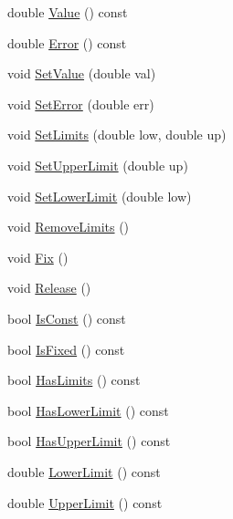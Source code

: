 \begin{DoxyCompactItemize}
\item 
double \mbox{\hyperlink{classROOT_1_1Minuit2_1_1MinuitParameter_ac77aed82006ba9e9598df49a1753d31c}{Value}} () const
\item 
double \mbox{\hyperlink{classROOT_1_1Minuit2_1_1MinuitParameter_af92997a2e9a7209fbddd286bbd1dbc3d}{Error}} () const
\item 
void \mbox{\hyperlink{classROOT_1_1Minuit2_1_1MinuitParameter_a535d59656c70ba8a0cc0ff196bac2d93}{Set\+Value}} (double val)
\item 
void \mbox{\hyperlink{classROOT_1_1Minuit2_1_1MinuitParameter_affa3dbe5755e6345181b98d168722a60}{Set\+Error}} (double err)
\item 
void \mbox{\hyperlink{classROOT_1_1Minuit2_1_1MinuitParameter_aeb1a61d3c007780ec388e11dd39274fc}{Set\+Limits}} (double low, double up)
\item 
void \mbox{\hyperlink{classROOT_1_1Minuit2_1_1MinuitParameter_a9e0c6225558635b19b5d10d0c6d9bb86}{Set\+Upper\+Limit}} (double up)
\item 
void \mbox{\hyperlink{classROOT_1_1Minuit2_1_1MinuitParameter_abf4e64af27e615b90fff7a21e2831488}{Set\+Lower\+Limit}} (double low)
\item 
void \mbox{\hyperlink{classROOT_1_1Minuit2_1_1MinuitParameter_a8c120aa76754c8c8209d0a8c78605137}{Remove\+Limits}} ()
\item 
void \mbox{\hyperlink{classROOT_1_1Minuit2_1_1MinuitParameter_ad0857ffbf012d785401c111cacc79085}{Fix}} ()
\item 
void \mbox{\hyperlink{classROOT_1_1Minuit2_1_1MinuitParameter_a9bf4bb232de53b61fc264c62b44d0b27}{Release}} ()
\item 
bool \mbox{\hyperlink{classROOT_1_1Minuit2_1_1MinuitParameter_afa82fc56a19c43531f469efc1fa34c2c}{Is\+Const}} () const
\item 
bool \mbox{\hyperlink{classROOT_1_1Minuit2_1_1MinuitParameter_a2d7f48ed0d6d1ac124e390e54df4de32}{Is\+Fixed}} () const
\item 
bool \mbox{\hyperlink{classROOT_1_1Minuit2_1_1MinuitParameter_a6319fe000027da162c4adad8782ef27b}{Has\+Limits}} () const
\item 
bool \mbox{\hyperlink{classROOT_1_1Minuit2_1_1MinuitParameter_a61b9c27aff1b1d7bf85bed898dd50dda}{Has\+Lower\+Limit}} () const
\item 
bool \mbox{\hyperlink{classROOT_1_1Minuit2_1_1MinuitParameter_a821e242fbbf23461e3b66a59126f3f02}{Has\+Upper\+Limit}} () const
\item 
double \mbox{\hyperlink{classROOT_1_1Minuit2_1_1MinuitParameter_a25c7f30fc42264f1df96a3852d2e11a4}{Lower\+Limit}} () const
\item 
double \mbox{\hyperlink{classROOT_1_1Minuit2_1_1MinuitParameter_a285e254a9574807222d2a74bb05e18d9}{Upper\+Limit}} () const
\end{DoxyCompactItemize}


